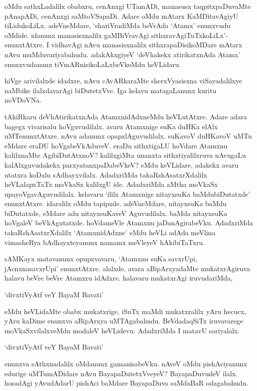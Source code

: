 oMdu sathxLadalilx obabxru, cenAnxgi UTamADi, manasusx taqpitxpaDuvaMte pAnapADi, cenAnxgi saMtoVSapaDi. Adare oMdu mAtarx KaMDitavAgiyU tiLidukoLiLx. adeVneMdare, `shariVradiMda beVrAda `Atamx' enunxvudu oMdide. idanunx manasisxnalilx gaMBiVravAgi sithxravAgiTuTxkoLiLx'-enunxtAtxre. I vidhavAgi nAvu manasisxnalilx sithxrapaDisikoMDare mAtarx nAvu muMduvariyabahudu. adakAkxgiyeV `deVhakekx atirikatxnAda Atamx' enunxvudanunx tiVmARnisikoLaLxbeVkeMdu heVLidaru.

hiVge arivilalxde idadxre, nAvu cAvARkaraMte sherxVyasisxna viSayadalilxye naMbike ilalxdavarAgi biDutetxVve. Iga kelavu matagaLanunx kuritu noVDoVNa.

tAkiRkaru deVhAtirikatxnAda AtamxnidAdxneMdu heVLutAtxre. Adare adara bagegx vivarisalu hoVguvudilalx. avaru Atamxnige suKa duHKa elAlx uMTenunxtAtxre. nAvu adanunx opapxlAguvudilalx. suKavoV duHKavoV uMTu eMdare eraDU hoVgabeVkAduveV. eraDu sithxtigaLU hoVdare Atamxnu kalilxnaMte AgibiDutAtxnoV? kalilxgiMta unanxta sithxtiyalilxruva nAvugaLu kalAlxguvudakekx parxyatanxpaDabeVkeV? eMdu keVLidare, adakekx avaru utatxra koDalu sAdhayxvilalx. AdadxriMda takaRshAsatxrXdalilx heVLalapxTaTx moVkaSx kalilxgU ide. AdadxriMda aMtha moVkaSx upayoVgavAguvudilalx. kelavaru `ililx Atamxnige nitayxsuKa baMdubiDutatxde' enunxtAtxre. idaralilx oMdu tapipxde. adeVneMdare, nitayxsuKa baMdu biDutatxde, eMdare adu nitayxsuKaveV Aguvudilalx. baMda nitayxsuKa hoVgaleV beVkAgutatxde. hoVdameVle Atamxnu jaDanAgirabeVku. AdadxriMda takaRshAsatxrXdalilx `AtamxnidAdxne' eMdu heVLi adAda meVlina vimasheRya bAdhayxteyanunx namamx meVleyeV hAkibiTaTxru. 

sAMKayx matavanunx opupxvavaru, `Atamxnu suKa savxrUpi, jAcnxnasavxrUpi' enunxtAtxre. alalxde, avara aBipArxyadaMte mukatxrAgiruva halavu beVre beVre Atamxru idAdxre. halavaru mukatxrAgi iruvudariMda,

\begin{shloka}
`divxtiVyAtf veY BayaM Bavati'
\end{shloka}

\noindent eMdu heVLidaMte obabx mukatxrige, iSuTx maMdi mukatxralilx yAru hecucx, yAru kaDime enunxva aBipArxya uMTAgabahudu. BeVdadaqSiTx iruvavarege moVkaSxvilalxveMdu modaleV heVLidevu. AdadxriMda I matavU sariyalalx.

\begin{shloka}
`divxtiVyAtf veY BayaM Bavati'
\end{shloka}

\noindent enunxva sAthxnadalilx oMdanunx gamanisabeVku. nAveV oMdu pishAciyanunx edurige uMTumADidare nAvu BayapaDutetxVveyeV? BayapaDuvudeV ilalx. hosadAgi yAvudAdarU pishAci baMdare BayapaDuva saMdaBaR odagabahudu.

